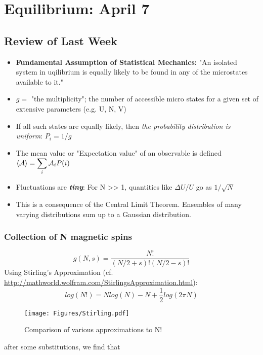 \section{Equilibrium: April 7}

\subsection{Review of Last Week}
\begin{itemize}
\item \textbf{Fundamental Assumption of Statistical Mechanics:} "An isolated system in uqilibrium is equally likely to be found in any of the microstates available to it."

\item $g =$ "the multiplicity"; the number of accessible micro states for a given set of extensive parameters (e.g. U, N, V)

\item If all such states are equally likely, then \textit{the probability distribution is uniform}: $P_i = 1/g$

\item The mean value or "Expectation value" of an observable  is defined 
  $\Braket{\mathcal{A}} = \displaystyle \sum_{i} \mathcal{A}_i P(i)$

\item Fluctuations are \textit{\textbf{tiny}}: For N >> 1, quantities like $\Delta U/U$ go as $1/\sqrt{N}$

\item This is a consequence of the Central Limit Theorem. Ensembles of many varying distributions sum up to a Gaussian distribution.

\end{itemize}

\subsubsection{Collection of N magnetic spins}
\begin{equation}
g(N,s) = \frac{N!}{(N/2 + s)! (N/2-s)!}
\end{equation}
Using Stirling's Approximation (cf. \url{http://mathworld.wolfram.com/StirlingsApproximation.html}):
\begin{equation}
log(N!) = N log(N) - N + \frac{1}{2}log(2 \pi N)
\end{equation}
\begin{figure}[h]
\centering
\texttt{[image: Figures/Stirling.pdf]}
\caption{Comparison of various approximations to N!}
\end{figure}
after some substitutions, we find that

